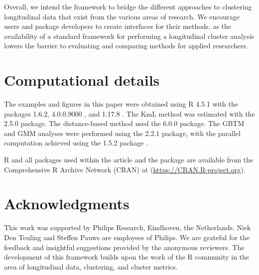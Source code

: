 Overall, we intend the framework to bridge the different approaches to clustering longitudinal data that exist from the various areas of research. We encourage users and package developers to create interfaces for their methods, as the availability of a standard framework for performing a longitudinal cluster analysis lowers the barrier to evaluating and comparing methods for applied researchers.

\section*{Computational details}\label{sec:technical}

The examples and figures in this paper were obtained using R 4.5.1 \citep{rcoreteam2021r} with the packages  1.6.2,  4.0.0.9000 \citep{Wickham2016ggplot2}, and  1.17.8 \citep{Dowle2020data.table}. The KmL method was estimated with the  2.5.0 package. The distance-based method used the  6.0.0 package. The GBTM and GMM analyses were performed using the  2.2.1 package, with the parallel computation achieved using the  1.5.2 package \citep{weston2022foreach}.

R and all packages used within the article and the  package are available from the Comprehensive R Archive Network (CRAN) at (\url{https://CRAN.R-project.org}).

\section*{Acknowledgments}\label{acknowledgments}

This work was supported by Philips Research, Eindhoven, the Netherlands. Niek Den Teuling and Steffen Pauws are employees of Philips. We are grateful for the feedback and insightful suggestions provided by the anonymous reviewers. The development of this framework builds upon the work of the R community in the area of longitudinal data, clustering, and cluster metrics.



\address{%
\\
Eindhoven University of Technology, and Philips Research\\%
\\
%
\url{https://github.com/niekdt}\\%
\textit{ORCiD: \href{https://orcid.org/0000-0003-1026-5080}{0000-0003-1026-5080}}\\%
\href{mailto:niek.den.teuling@philips.com}{\nolinkurl{niek.den.teuling@philips.com}}%
}

